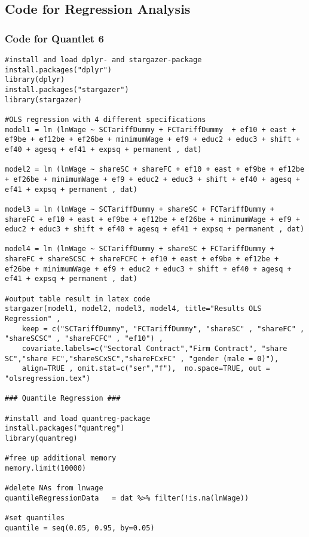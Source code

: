 \subsection{Code for Regression Analysis}
\subsubsection{Code for Quantlet 6}
\lstset{firstnumber = 415}
\begin{lstlisting}
#install and load dplyr- and stargazer-package
install.packages("dplyr")
library(dplyr)
install.packages("stargazer")
library(stargazer)

#OLS regression with 4 different specifications
model1 = lm (lnWage ~ SCTariffDummy + FCTariffDummy  + ef10 + east + ef9be + ef12be + ef26be + minimumWage + ef9 + educ2 + educ3 + shift + ef40 + agesq + ef41 + expsq + permanent , dat)

model2 = lm (lnWage ~ shareSC + shareFC + ef10 + east + ef9be + ef12be + ef26be + minimumWage + ef9 + educ2 + educ3 + shift + ef40 + agesq + ef41 + expsq + permanent , dat)

model3 = lm (lnWage ~ SCTariffDummy + shareSC + FCTariffDummy + shareFC + ef10 + east + ef9be + ef12be + ef26be + minimumWage + ef9 + educ2 + educ3 + shift + ef40 + agesq + ef41 + expsq + permanent , dat)

model4 = lm (lnWage ~ SCTariffDummy + shareSC + FCTariffDummy + shareFC + shareSCSC + shareFCFC + ef10 + east + ef9be + ef12be + ef26be + minimumWage + ef9 + educ2 + educ3 + shift + ef40 + agesq + ef41 + expsq + permanent , dat)

#output table result in latex code
stargazer(model1, model2, model3, model4, title="Results OLS Regression" ,
	keep = c("SCTariffDummy", "FCTariffDummy", "shareSC" , "shareFC" , "shareSCSC" , "shareFCFC" , "ef10") , 
	covariate.labels=c("Sectoral Contract","Firm Contract", "share SC","share FC","shareSCxSC","shareFCxFC" , "gender (male = 0)"),
	align=TRUE , omit.stat=c("ser","f"),  no.space=TRUE, out = "olsregression.tex")

### Quantile Regression ###

#install and load quantreg-package
install.packages("quantreg")
library(quantreg)

#free up additional memory
memory.limit(10000)   

#delete NAs from lnwage
quantileRegressionData   = dat %>% filter(!is.na(lnWage)) 

#set quantiles
quantile = seq(0.05, 0.95, by=0.05)   


\end{lstlisting}
